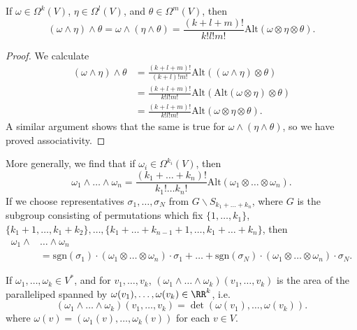 \begin{theorem}
    If $\omega \in \Omega^k(V)$, $\eta \in \Omega^l(V)$, and $\theta \in \Omega^m(V)$, then
    \[ (\omega \wedge \eta) \wedge \theta = \omega \wedge (\eta \wedge \theta) = \frac{(k + l + m)!}{k! l! m!} \text{Alt}(\omega \otimes \eta \otimes \theta). \]
\end{theorem}
\begin{proof}
    We calculate
    \begin{align*}
        (\omega \wedge \eta) \wedge \theta &= \frac{(k + l + m)!}{(k + l)! m!} \text{Alt}((\omega \wedge \eta) \otimes \theta)\\
        &= \frac{(k+l+m)!}{k! l! m!} \text{Alt}(\text{Alt}(\omega \otimes \eta) \otimes \theta)\\
        &= \frac{(k+l+m)!}{k! l! m!} \text{Alt}(\omega \otimes \eta \otimes \theta).
    \end{align*}
    A similar argument shows that the same is true for $\omega \wedge (\eta \wedge \theta)$, so we have proved associativity.
\end{proof}

\begin{remark}
    More generally, we find that if $\omega_i \in \Omega^{k_i}(V)$, then
    \[ \omega_1 \wedge \dots \wedge \omega_n = \frac{(k_1 + \dots + k_n)!}{k_1! \dots k_n!} \text{Alt}(\omega_1 \otimes \dots \otimes \omega_n). \]
    If we choose representatives $\sigma_1, \dots, \sigma_N$ from $G \backslash S_{k_1 + \dots + k_n}$, where $G$ is the subgroup consisting of permutations which fix $\{ 1, \dots, k_1 \}$, $\{ k_1 + 1, \dots, k_1 + k_2 \}, \dots, \{ k_1 + \dots + k_{n-1} + 1, \dots, k_1 + \dots + k_n \}$, then
    \begin{align*}
        \omega_1 \wedge& \dots \wedge \omega_n\\
        &= \text{sgn}(\sigma_1) \cdot (\omega_1 \otimes \dots \otimes \omega_n) \cdot \sigma_1 + \dots + \text{sgn}(\sigma_N) \cdot (\omega_1 \otimes \dots \otimes \omega_n) \cdot \sigma_N.
    \end{align*}
\end{remark}

\begin{remark}
    If $\omega_1, \dots, \omega_k \in V^*$, and for $v_1, \dots, v_k$, $(\omega_1 \wedge \dots \wedge \omega_k)(v_1, \dots,v_k)$ is the area of the paralleliped spanned by $\omega(v_1), \dots, \omega(v_k) \in \RR^k$, i.e.
    \[ (\omega_1 \wedge \dots \wedge \omega_k)(v_1, \dots,v_k) = \det(\omega(v_1), \dots, \omega(v_k)). \]
    where $\omega(v) = (\omega_1(v), \dots, \omega_k(v))$ for each $v \in V$.
\end{remark}

